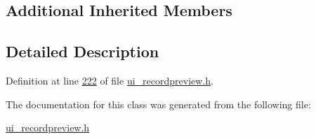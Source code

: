\subsection*{Additional Inherited Members}


\subsection{Detailed Description}


Definition at line \hyperlink{a00140_source_l00222}{222} of file \hyperlink{a00140_source}{ui\+\_\+recordpreview.\+h}.



The documentation for this class was generated from the following file\+:\begin{DoxyCompactItemize}
\item 
\hyperlink{a00140}{ui\+\_\+recordpreview.\+h}\end{DoxyCompactItemize}
